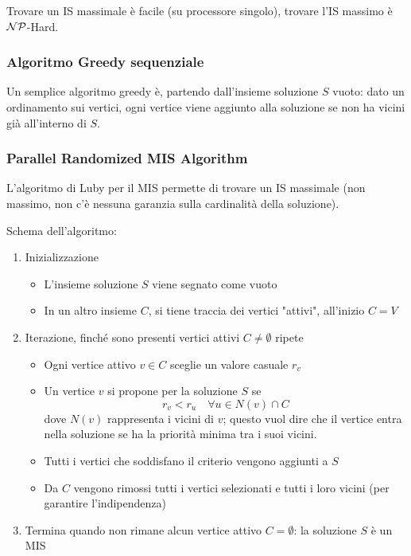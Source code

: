 Trovare un IS massimale è facile (su processore singolo), trovare l'IS massimo è $\mathcal{NP}$-Hard.

\subsubsection{Algoritmo Greedy sequenziale}

Un semplice algoritmo greedy è, partendo dall'insieme soluzione $S$ vuoto: dato un ordinamento sui vertici, ogni vertice viene aggiunto alla soluzione se non ha vicini già all'interno di $S$.

\subsubsection{Parallel Randomized MIS Algorithm}

L'algoritmo di Luby per il MIS permette di trovare un IS massimale (non massimo, non c'è nessuna garanzia sulla cardinalità della soluzione). 

Schema dell'algoritmo: 
\begin{enumerate}
    \item Inizializzazione 
    \begin{itemize}
        \item L'insieme soluzione $S$ viene segnato come vuoto
    
        \item In un altro insieme $C$, si tiene traccia dei vertici "attivi", all'inizio $C = V$
    \end{itemize}
    
    \item Iterazione, finché sono presenti vertici attivi $C \neq \emptyset$ ripete
    \begin{itemize}
        \item Ogni vertice attivo $v \in C$ sceglie un valore casuale $r_v$
        
        \item Un vertice $v$ si propone per la soluzione $S$ se 
        $$ r_v < r_u \quad \forall u \in N(v) \cap C $$
        dove $N(v)$ rappresenta i vicini di $v$; questo vuol dire che il vertice entra nella soluzione se ha la priorità minima tra i suoi vicini.
        
        \item Tutti i vertici che soddisfano il criterio vengono aggiunti a $S$
        
        \item Da $C$ vengono rimossi tutti i vertici selezionati e tutti i loro vicini (per garantire l'indipendenza)
    \end{itemize}
    
    \item Termina quando non rimane alcun vertice attivo $C = \emptyset$: la soluzione $S$ è un MIS
\end{enumerate}

